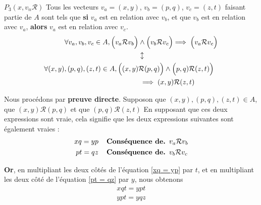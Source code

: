\documentclass[16pt]{report}
\begin{document}
\begin{multicols*}{2}
            \begin{prop}{$P_3(x, v_n \mathcal{R}) $}{}
                Tous les vecteurs $v_a = (x, y)$, $v_b = (p, q)$, $v_c = (z, t)$ faisant partie de 
                $A$ sont tels que \textbf{si} $v_a$ est en relation avec $v_b$, et que $v_b$ est en relation avec 
                $v_a$, \textbf{alors}  $v_a$ est en relation avec $v_c$. 
                    \begin{align*}
                        \forall v_a, v_b, v_c \in A, \Bigl(v_a \mathcal{R}v_b\Bigr) &\land  
                    \Bigl(v_b\mathcal{R}v_c\Bigl) \implies \Bigl(v_a \mathcal{R} v_c \Bigr)  \\ 
                                     &\updownarrow \\ 
                    \forall (x,y), (p, q), (z, t) \in A, \Bigl((x, y) &\mathcal{R}(p, q)\Bigr) 
                    \land \Bigl(p, q)\mathcal{R}(z, t)\Bigr) \\ 
                                    &\implies (x, y) \mathcal{R} (z, t)
                    \end{align*}     
            \end{prop}

            \begin{Preuve}{}{}
                Nous procédons par \textbf{preuve directe}. Supposon que 
                $(x,y), (p, q), (z, t) \in A$, que  
                $(x, y) \mathcal{R}(p, q)$ et que  $(p, q)\mathcal{R}(z, t)$
                En supposant que ces deux expressions sont vraie, cela signifie que les deux expressions 
                suivantes sont également vraies : 
                 \begin{align}
                     xq = yp & \textbf{\quad Conséquence de. $v_a\mathcal{R}v_b$} \label{xq = yp}\\ 
                     pt = qz & \textbf{\quad Conséquence de. $v_b\mathcal{R}v_c$} \label{pt = qz}
                 \end{align}

                 \textbf{Or}, en multipliant les deux côtés de l'équation \eqref{xq = yp} par $t$, 
                 et en multipliant les deux côté de l'équation \eqref{pt = qz} par $y$, nous obtenons
                 \begin{align}
                     xqt = ypt \label{xqt = ypt} \\
                     ypt = yqz \label{ypt = yqz}
                 \end{align}


\end{Preuve}
\end{multicols*}
\end{document}
